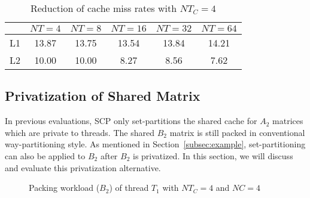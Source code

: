 \begin{table}
  \centering
  \caption{Reduction of cache miss rates with $NT_C=4$}
  \label{tab:papi}
  \setlength{\tabcolsep}{3.5pt}
  \begin{tabular}{lccccc}
    \toprule
     & $NT=4$ & $NT=8$ & $NT=16$ & $NT=32$ & $NT=64$ \\
    \midrule
    L1     & 13.87 & 13.75 & 13.54 & 13.84 & 14.21 \\
    L2     & 10.00 & 10.00 & 8.27 & 8.56 & 7.62 \\
    \bottomrule
  \end{tabular}
\end{table}

\subsection{Privatization of Shared Matrix}\label{subsec:privb}
In previous evaluations, SCP only set-partitions the shared cache
for $A_2$ matrices which are private to threads.
The shared $B_2$ matrix is still packed
in conventional way-partitioning style.
As mentioned in Section~\ref{subsec:example},
set-partitioning can also be applied to $B_2$ after $B_2$ is privatized.
In this section, we will discuss and evaluate this privatization alternative.

\begin{figure}
  \centering
  \caption{Packing workload ($B_2$) of thread $T_1$ with $NT_C=4$ and $NC=4$}
  \label{fig:packb}
\end{figure}

